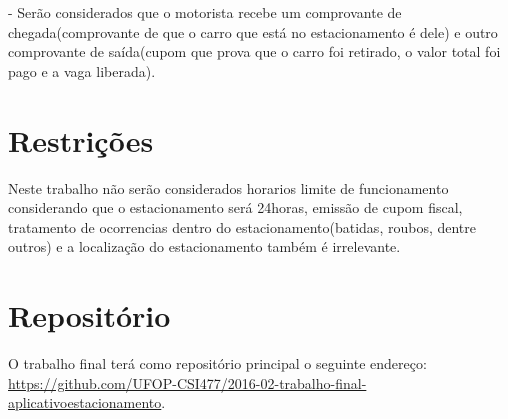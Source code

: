 \documentclass[10pt,a4paper,article]{abntex2}
\begin{document}
- Serão considerados que o motorista recebe um comprovante de chegada(comprovante de que o carro que está no estacionamento é dele) e outro comprovante de saída(cupom que prova que o carro foi retirado, o valor total foi pago e a vaga liberada).


	\section{Restrições}

		Neste trabalho não serão considerados horarios limite de funcionamento considerando que o estacionamento será 24horas, emissão de cupom fiscal, tratamento de ocorrencias dentro do estacionamento(batidas, roubos, dentre outros) e a localização do estacionamento também é irrelevante.

	\section{Repositório}

		O trabalho final terá como repositório principal o seguinte endereço: \url{https://github.com/UFOP-CSI477/2016-02-trabalho-final-aplicativoestacionamento}.

\end{document}
